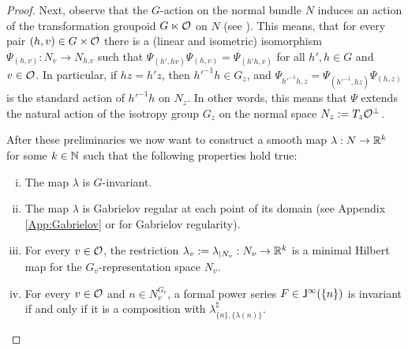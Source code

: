 \begin{proof}
Next, observe that the $G$-action on the normal bundle $N$ induces an action of the 
transformation groupoid 
$G\ltimes \mathcal{O}$  on $N$ (see \cite[Sec.~3]{PflPosTanGOSPLG}). This means, that for every pair 
$(h,v) \in G \times \mathcal{O}$ there is a (linear and isometric) isomorphism 
$\Psi_{(h,v)} : N_v \rightarrow N_{h.v}$ such that $\Psi_{(h',hv)} \Psi_{(h,v)}= \Psi_{(h'h,v)}$ for all
$h',h\in G$ and $v\in \mathcal{O}$. In particular, if $hz = h'z$, then $ h'^{-1}h \in G_z$, and  
$\Psi_{h'^{-1}h,z} = \Psi_{(h'^{-1},hz)} \Psi_{(h,z)} $ is the standard action of  $ h'^{-1}h$ on $N_z$.
In other words, this means that $\Psi$ extends the natural action of the isotropy group $G_z$
on the normal space $N_z := T_z\mathcal{O}^\perp$.  

After these preliminaries we now want to construct a smooth map $\lambda :N \rightarrow \mathbb{R}^k$
for some $k\in \mathbb{N}$ such that the following properties hold true:
\begin{enumerate}[(i)]
\item \label{Ite:SecProj}
      The map $ \lambda$ is $G$-invariant.
\item \label{Ite:GabProp}
      The map $\lambda$ is Gabrielov regular at each point of its domain 
      (see Appendix \ref{App:Gabrielov} or \cite{PawGRCAM} for Gabrielov regularity).
\item \label{Ite:HilMap} For every $v\in \mathcal{O}$, the
  restriction $\lambda_v := \lambda_{|N_v} : N_v\rightarrow \mathbb{R}^k$ 
  is a minimal Hilbert map for the $G_v$-representation space $N_v$.
\item \label{Ite:FormComp}
      For every $v\in \mathcal{O}$ and $n\in N_v^{G_v}$, a formal power series 
      $F\in \mathsf{J}^\infty (\{n\})$ is invariant if and only if it is a composition with 
      $\lambda^{\sharp}_{\{n\},\{\lambda(n)\}} $.  
\end{enumerate}


\end{proof}
